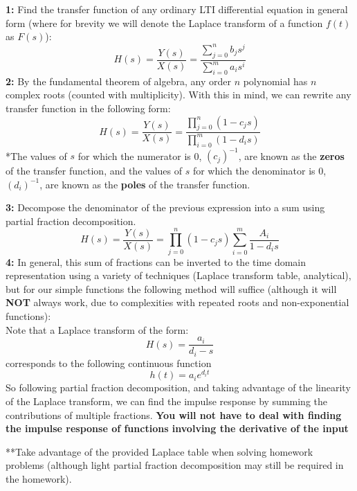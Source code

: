 \documentclass[a4paper]{article}
\numberwithin{equation}{section}
\begin{document}
\textbf{1:}  Find the transfer function of any ordinary LTI differential equation in general form (where for brevity we will denote the Laplace transform of a function $f(t)$ as $F(s)$):
\begin{equation}
H(s)=\frac{Y(s)}{X(s)}=\frac{\sum_{j=0}^{n} b_j s^{j}}{\sum_{i=0}^{m} a_i s^{i}}
\end{equation}
\textbf{2:}  By the fundamental theorem of algebra, any order $n$ polynomial has $n$ complex roots (counted with multiplicity). With this in mind, we can rewrite any transfer function in the following form:
\begin{equation}
H(s)=\frac{Y(s)}{X(s)}=\frac{\prod_{j=0}^{n} (1-c_j s)}{\prod_{i=0}^{m}(1-d_i s)}
\end{equation}
*The values of $s$ for which the numerator is 0, $(c_j)^{-1}$, are known as the \textbf{zeros} of the transfer function, and the values of $s$ for which the denominator is 0, $(d_i)^{-1}$, are known as the \textbf{poles} of the transfer function. 

\textbf{3:}  Decompose the denominator of the previous expression into a sum using partial fraction decomposition.
\begin{equation}
H(s)=\frac{Y(s)}{X(s)}=\prod_{j=0}^{n} (1-c_j s)\sum_{i=0}^{m}\frac{A_i}{1-d_i s}
\end{equation}
\textbf{4:}  In general, this sum of fractions can be inverted to the time domain representation using a variety of techniques (Laplace transform table, analytical), but for our simple functions the following method will suffice (although it will \textbf{NOT} always work, due to complexities with repeated roots and non-exponential functions):\\

Note that a Laplace transform of the form:
\begin{equation}
H(s)=\frac{a_i}{d_i - s}
\end{equation}
corresponds to the following continuous function
\begin{equation}
h(t) = a_i e^{d_i t}
\end{equation}
So following partial fraction decomposition, and taking advantage of the linearity of the Laplace transform, we can find the impulse response by summing the contributions of multiple fractions. \textbf{You will not have to deal with finding the impulse response of functions involving the derivative of the input}

**Take advantage of the provided Laplace table when solving homework problems (although light partial fraction decomposition may still be required in the homework).
\end{document}
